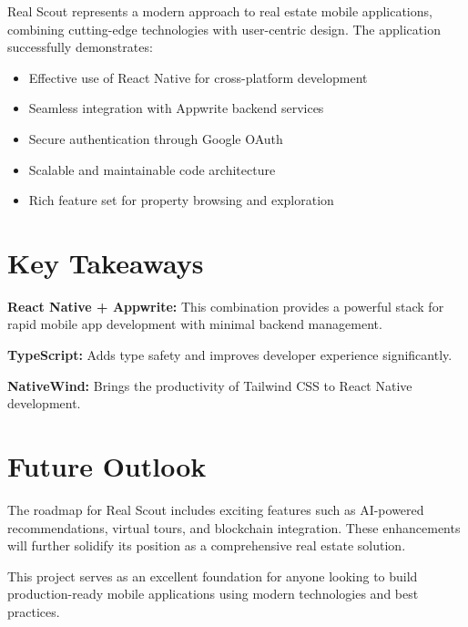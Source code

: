 \documentclass[11pt,a4paper,oneside]{book}
\begin{document}
Real Scout represents a modern approach to real estate mobile applications, combining cutting-edge technologies with user-centric design. The application successfully demonstrates:

\begin{itemize}
    \item Effective use of React Native for cross-platform development
    \item Seamless integration with Appwrite backend services
    \item Secure authentication through Google OAuth
    \item Scalable and maintainable code architecture
    \item Rich feature set for property browsing and exploration
\end{itemize}

\section{Key Takeaways}

\begin{definitionbox}
\textbf{React Native + Appwrite:} This combination provides a powerful stack for rapid mobile app development with minimal backend management.

\textbf{TypeScript:} Adds type safety and improves developer experience significantly.

\textbf{NativeWind:} Brings the productivity of Tailwind CSS to React Native development.
\end{definitionbox}

\section{Future Outlook}

The roadmap for Real Scout includes exciting features such as AI-powered recommendations, virtual tours, and blockchain integration. These enhancements will further solidify its position as a comprehensive real estate solution.

\begin{notebox}
This project serves as an excellent foundation for anyone looking to build production-ready mobile applications using modern technologies and best practices.
\end{notebox}

\appendix
\end{document}
